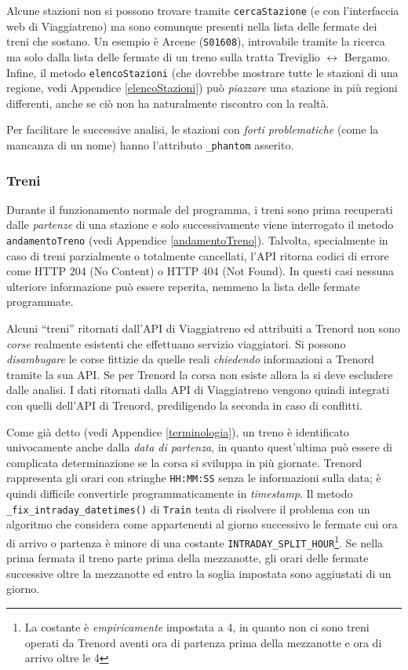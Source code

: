 \documentclass[12pt,italian]{report}
\begin{document}
Alcune stazioni non si possono trovare tramite \texttt{cercaStazione}
(e con l'interfaccia web di Viaggiatreno) ma sono comunque presenti
nella lista delle fermate dei treni che sostano.  Un esempio è Arcene
(\texttt{S01608}), introvabile tramite la ricerca ma solo dalla lista
delle fermate di un treno sulla tratta Treviglio $\leftrightarrow$
Bergamo.  Infine, il metodo \texttt{elencoStazioni} (che dovrebbe
mostrare tutte le stazioni di una regione, vedi Appendice
\ref{elencoStazioni}) può \textit{piazzare} una stazione in più
regioni differenti, anche se ciò non ha naturalmente riscontro con la
realtà.

Per facilitare le successive analisi, le stazioni con \textit{forti
    problematiche} (come la mancanza di un nome) hanno l'attributo
\texttt{\_phantom} asserito.

\subsubsection{Treni}

Durante il funzionamento normale del programma, i treni sono prima
recuperati dalle \textit{partenze} di una stazione e solo
successivamente viene interrogato il metodo \texttt{andamentoTreno}
(vedi Appendice \ref{andamentoTreno}).  Talvolta, specialmente in caso
di treni parzialmente o totalmente cancellati, l'API ritorna codici di
errore come HTTP 204 (No Content) o HTTP 404 (Not Found).  In questi
casi nessuna ulteriore informazione può essere reperita, nemmeno la
lista delle fermate programmate.

Alcuni ``treni'' ritornati dall'API di Viaggiatreno ed attribuiti a
Trenord non sono \textit{corse} realmente esistenti che effettuano
servizio viaggiatori.  Si possono \textit{disambugare} le corse
fittizie da quelle reali \textit{chiedendo} informazioni a Trenord
tramite la sua API\@.  Se per Trenord la corsa non esiste allora la si
deve escludere dalle analisi.  I dati ritornati dalla API di
Viaggiatreno vengono quindi integrati con quelli dell'API di Trenord,
prediligendo la seconda in caso di conflitti.

Come già detto (vedi Appendice \ref{terminologia}), un treno è
identificato univocamente anche dalla \textit{data di partenza}, in
quanto quest'ultima può essere di complicata determinazione se la
corsa si sviluppa in più giornate.  Trenord rappresenta gli orari con
stringhe \texttt{HH:MM:SS} senza le informazioni sulla data; è quindi
difficile convertirle programmaticamente in \textit{timestamp}.  Il
metodo \texttt{\_fix\_intraday\_datetimes()} di \texttt{Train} tenta
di risolvere il problema con un algoritmo che considera come
appartenenti al giorno successivo le fermate cui ora di arrivo o
partenza è minore di una costante
\texttt{INTRADAY\_\-SPLIT\_\-HOUR}\footnote{La costante è
    \textit{empiricamente} impostata a 4, in quanto non ci sono treni
    operati da Trenord aventi ora di partenza prima della mezzanotte e
    ora di arrivo oltre le 4}.  Se nella prima fermata il treno parte
prima della mezzanotte, gli orari delle fermate successive oltre la
mezzanotte ed entro la soglia impostata sono aggiustati di un giorno.
\end{document}

